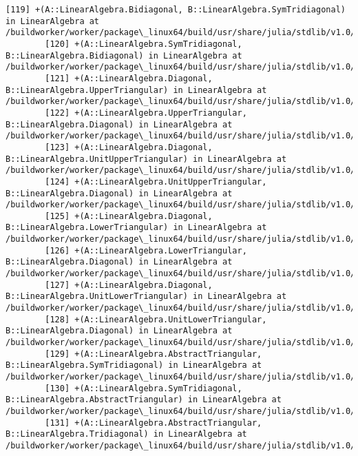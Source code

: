 \documentclass[11pt]{article}
\begin{document}
\begin{Verbatim}[commandchars=\\\{\}]
        [119] +(A::LinearAlgebra.Bidiagonal, B::LinearAlgebra.SymTridiagonal) in LinearAlgebra at /buildworker/worker/package\_linux64/build/usr/share/julia/stdlib/v1.0/LinearAlgebra/src/special.jl:105
        [120] +(A::LinearAlgebra.SymTridiagonal, B::LinearAlgebra.Bidiagonal) in LinearAlgebra at /buildworker/worker/package\_linux64/build/usr/share/julia/stdlib/v1.0/LinearAlgebra/src/special.jl:106
        [121] +(A::LinearAlgebra.Diagonal, B::LinearAlgebra.UpperTriangular) in LinearAlgebra at /buildworker/worker/package\_linux64/build/usr/share/julia/stdlib/v1.0/LinearAlgebra/src/special.jl:117
        [122] +(A::LinearAlgebra.UpperTriangular, B::LinearAlgebra.Diagonal) in LinearAlgebra at /buildworker/worker/package\_linux64/build/usr/share/julia/stdlib/v1.0/LinearAlgebra/src/special.jl:118
        [123] +(A::LinearAlgebra.Diagonal, B::LinearAlgebra.UnitUpperTriangular) in LinearAlgebra at /buildworker/worker/package\_linux64/build/usr/share/julia/stdlib/v1.0/LinearAlgebra/src/special.jl:117
        [124] +(A::LinearAlgebra.UnitUpperTriangular, B::LinearAlgebra.Diagonal) in LinearAlgebra at /buildworker/worker/package\_linux64/build/usr/share/julia/stdlib/v1.0/LinearAlgebra/src/special.jl:118
        [125] +(A::LinearAlgebra.Diagonal, B::LinearAlgebra.LowerTriangular) in LinearAlgebra at /buildworker/worker/package\_linux64/build/usr/share/julia/stdlib/v1.0/LinearAlgebra/src/special.jl:117
        [126] +(A::LinearAlgebra.LowerTriangular, B::LinearAlgebra.Diagonal) in LinearAlgebra at /buildworker/worker/package\_linux64/build/usr/share/julia/stdlib/v1.0/LinearAlgebra/src/special.jl:118
        [127] +(A::LinearAlgebra.Diagonal, B::LinearAlgebra.UnitLowerTriangular) in LinearAlgebra at /buildworker/worker/package\_linux64/build/usr/share/julia/stdlib/v1.0/LinearAlgebra/src/special.jl:117
        [128] +(A::LinearAlgebra.UnitLowerTriangular, B::LinearAlgebra.Diagonal) in LinearAlgebra at /buildworker/worker/package\_linux64/build/usr/share/julia/stdlib/v1.0/LinearAlgebra/src/special.jl:118
        [129] +(A::LinearAlgebra.AbstractTriangular, B::LinearAlgebra.SymTridiagonal) in LinearAlgebra at /buildworker/worker/package\_linux64/build/usr/share/julia/stdlib/v1.0/LinearAlgebra/src/special.jl:124
        [130] +(A::LinearAlgebra.SymTridiagonal, B::LinearAlgebra.AbstractTriangular) in LinearAlgebra at /buildworker/worker/package\_linux64/build/usr/share/julia/stdlib/v1.0/LinearAlgebra/src/special.jl:125
        [131] +(A::LinearAlgebra.AbstractTriangular, B::LinearAlgebra.Tridiagonal) in LinearAlgebra at /buildworker/worker/package\_linux64/build/usr/share/julia/stdlib/v1.0/LinearAlgebra/src/special.jl:124

\end{Verbatim}
\end{document}
